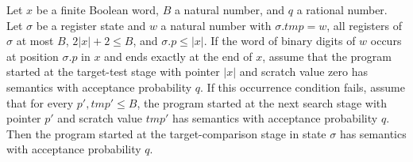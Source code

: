 \begin{lemma}
\label{Complexity.LogProg.ups_tcmp}
\leanok
{}
Let $x$ be a finite Boolean word, $B$ a natural number, and $q$ a rational number. Let
$\sigma$ be a register state and $w$ a natural number with $\sigma.tmp=w$, all registers
of $\sigma$ at most $B$, $2|x|+2\le B$, and $\sigma.p\le |x|$. If the word of binary
digits of $w$ occurs at position $\sigma.p$ in $x$ and ends exactly at the end of $x$,
assume that the program started at the target-test stage with pointer $|x|$ and scratch
value zero has semantics with acceptance probability $q$. If this occurrence condition
fails, assume that for every $p',tmp'\le B$, the program started at the next search
stage with pointer $p'$ and scratch value $tmp'$ has semantics with acceptance
probability $q$. Then the program started at the target-comparison stage in state
$\sigma$ has semantics with acceptance probability $q$.
\end{lemma}


